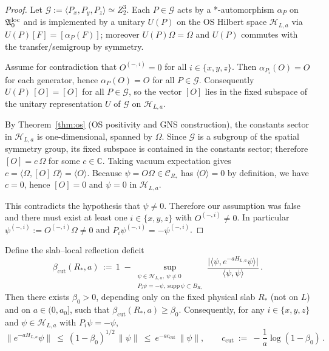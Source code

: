 \documentclass[11pt]{amsart}
\begin{document}
\begin{proof}
Let $\mathcal{G}:=\langle P_x,P_y,P_z\rangle\simeq Z_2^3$. Each $P\in\mathcal{G}$ acts by a *-automorphism $\alpha_P$ on $\mathfrak{A}_0^{\rm loc}$ and is implemented by a unitary $U(P)$ on the OS Hilbert space $\mathcal{H}_{L,a}$ via $U(P)[F]=[\alpha_P(F)]$; moreover $U(P)\Omega=\Omega$ and $U(P)$ commutes with the transfer/semigroup by symmetry.

Assume for contradiction that $O^{(-,i)}=0$ for all $i\in\{x,y,z\}$. Then $\alpha_{P_i}(O)=O$ for each generator, hence $\alpha_P(O)=O$ for all $P\in\mathcal{G}$. Consequently $U(P)\,[O]=[O]$ for all $P\in\mathcal{G}$, so the vector $[O]$ lies in the fixed subspace of the unitary representation $U$ of $\mathcal{G}$ on $\mathcal{H}_{L,a}$.

By Theorem~\ref{thm:os} (OS positivity and GNS construction), the constants sector in $\mathcal{H}_{L,a}$ is one-dimensional, spanned by $\Omega$. Since $\mathcal{G}$ is a subgroup of the spatial symmetry group, its fixed subspace is contained in the constants sector; therefore $[O]=c\,\Omega$ for some $c\in\mathbb{C}$. Taking vacuum expectation gives $c=\langle\Omega,[O]\,\Omega\rangle=\langle O\rangle$. Because $\psi=O\Omega\in\mathcal{C}_{R_*}$ has $\langle O\rangle=0$ by definition, we have $c=0$, hence $[O]=0$ and $\psi=0$ in $\mathcal{H}_{L,a}$.

This contradicts the hypothesis that $\psi\ne 0$. Therefore our assumption was false and there must exist at least one $i\in\{x,y,z\}$ with $O^{(-,i)}\ne 0$. In particular $\psi^{(-,i)}:=O^{(-,i)}\Omega\ne 0$ and $P_i\psi^{(-,i)}=-\psi^{(-,i)}$.
\end{proof}

\begin{lemma}\label{lem:odd-contraction-tp}
Define the slab--local reflection deficit
\[
  \beta_{\mathrm{cut}}(R_*,a)
  \,:=\,
  1\;-
  \sup_{\substack{\psi\in\mathcal H_{L,a},\ \psi\ne 0\\ P_i\psi=-\psi,\ \mathrm{supp}\,\psi\subset B_{R_*}}}
  \frac{\big|\langle\psi, e^{-aH_{L,a}}\psi\rangle\big|}{\langle\psi,\psi\rangle}\,.
\]
Then there exists $\beta_0>0$, depending only on the fixed physical slab $R_*$ (not on $L$) and on $a\in(0,a_0]$, such that $\beta_{\mathrm{cut}}(R_*,a)\ge \beta_0$. Consequently, for any $i\in\{x,y,z\}$ and $\psi\in\mathcal{H}_{L,a}$ with $P_i\psi=-\psi$,
\[
  \|e^{-aH_{L,a}}\psi\|\ \le\ (1-\beta_0)^{1/2}\,\|\psi\|\ \le\ e^{-a c_{\mathrm{cut}}}\,\|\psi\|,
  \qquad c_{\mathrm{cut}}\ :=\ -\frac{1}{a}\log(1-\beta_0)\,.
\]
\end{lemma}
\end{document}
